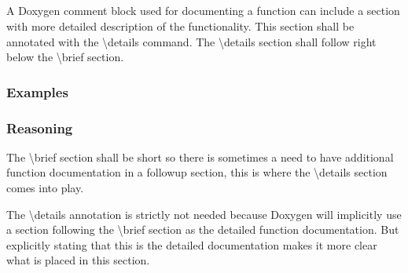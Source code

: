 \subsection*{\doxygenRule{}}

A Doxygen comment block used for documenting a function can include a section with more detailed description of the functionality. This section shall be annotated with the \textbackslash details command. The \textbackslash details section shall follow right below the \textbackslash brief section.

\subsubsection*{Examples}

\noindent
\begin{minipage}[t]{\codelstwidth\textwidth}
    
\end{minipage}\hfill
\begin{minipage}[t]{\codelstwidth\textwidth}
    
\end{minipage}

\subsubsection*{Reasoning}

The \textbackslash brief section shall be short so there is sometimes a need to have additional function documentation in a followup section, this is where the \textbackslash details section comes into play.

The \textbackslash details annotation is strictly not needed because Doxygen will implicitly use a section following the \textbackslash brief section as the detailed function documentation. But explicitly stating that this is the detailed documentation makes it more clear what is placed in this section.
